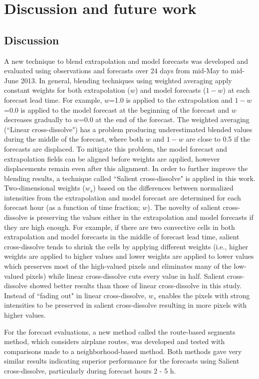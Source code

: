 \documentclass[12pt]{article}
\begin{document}
\section{Discussion and future work}
\subsection{Discussion}

A new technique to blend extrapolation and model forecasts was developed and evaluated using observations and forecasts over 24 days from mid-May to mid-June 2013. In general, blending techniques using weighted averaging apply constant weights for both extrapolation ($w$) and model forecasts ($1-w$) at each forecast lead time. For example, $w$=1.0 is applied to the extrapolation and $1-w$=0.0 is applied to the model forecast at the beginning of the forecast and $w$ decreases gradually to $w$=0.0 at the end of the forecast. The weighted averaging (``Linear cross-dissolve") has a problem producing underestimated blended values during the middle of the forecast, where both $w$ and $1-w$ are close to 0.5 if the forecasts are displaced. To mitigate this problem, the model forecast and extrapolation fields can be aligned before weights are applied, however displacements remain even after this alignment. In order to further improve the blending results, a technique called ``Salient cross-dissolve" is applied in this work. Two-dimensional weights ($w_{s}$) based on the differences between normalized intensities from the extrapolation and model forecast are determined for each forecast hour (as a function of time fraction; $w$). The novelty of salient cross-dissolve is preserving the values either in the extrapolation and model forecasts if they are high enough. For example, if there are two convective cells in both extrapolation and model forecasts in the middle of forecast lead time, salient cross-dissolve tends to shrink the cells by applying different weights (i.e., higher weights are applied to higher values and lower weights are applied to lower values which preserves most of the high-valued pixels and eliminates many of the low-valued pixels) while linear cross-dissolve cuts every value in half. Salient cross-dissolve showed better results than those of linear cross-dissolve in this study. Instead of ``fading out" in linear cross-dissolve, $w_{s}$ enables the pixels with strong intensities to be preserved in salient cross-dissolve resulting in more pixels with higher values. 

For the forecast evaluations, a new method called the route-based segments method, which considers airplane routes, was developed and tested with comparisons made to a neighborhood-based method. Both methods gave very similar results indicating superior performance for the forecasts using Salient cross-dissolve, particularly during forecast hours 2 - 5 h.
\end{document}
